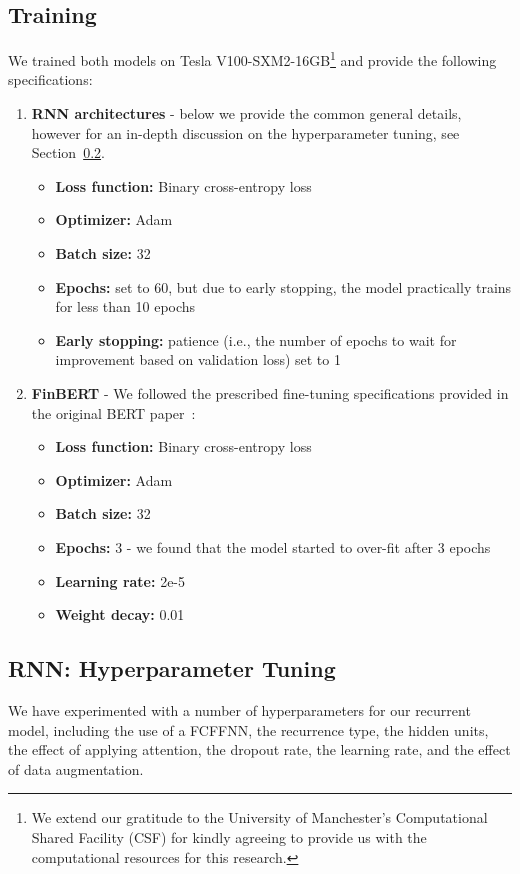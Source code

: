 \subsection{Training}\label{subsec:training}
We trained both models on Tesla V100-SXM2-16GB\footnote{
    We extend our gratitude to the University of Manchester's Computational Shared Facility (CSF) for kindly agreeing to provide us with the computational resources for this research.
} and provide the following specifications:
\begin{enumerate}
    \item \textbf{RNN architectures} - below we provide the common general details, however for an in-depth discussion on the hyperparameter tuning, see Section~\ref{subsec:hyperparameters}.
        \begin{itemize}
            \item \textbf{Loss function:} Binary cross-entropy loss
            \item \textbf{Optimizer:} Adam~\cite{kingma2017adam}
            \item \textbf{Batch size:} 32
            \item \textbf{Epochs:} set to 60, but due to early stopping, the model practically trains for less than 10 epochs
            \item \textbf{Early stopping:} patience (i.e., the number of epochs to wait for improvement based on validation loss) set to 1
        \end{itemize}
    \item \textbf{FinBERT} - We followed the prescribed fine-tuning specifications provided in the original BERT paper~\cite{devlin-etal-2019-bert}:
        \begin{itemize}
            \item \textbf{Loss function:} Binary cross-entropy loss
            \item \textbf{Optimizer:} Adam~\cite{kingma2017adam}
            \item \textbf{Batch size:} 32
            \item \textbf{Epochs:} 3 - we found that the model started to over-fit after 3 epochs
            \item \textbf{Learning rate:} 2e-5
            \item \textbf{Weight decay:} 0.01
        \end{itemize}
\end{enumerate}


\subsection{RNN: Hyperparameter Tuning}\label{subsec:hyperparameters}
We have experimented with a number of hyperparameters for our recurrent model, including the use of a FCFFNN,
the recurrence type, the hidden units, the effect of applying attention, the dropout rate, the learning rate, and the effect of data augmentation.


